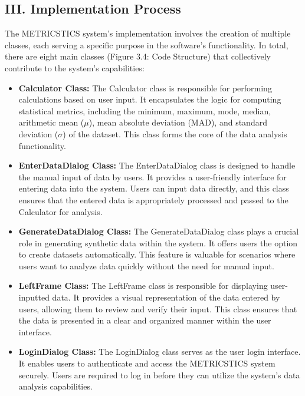 \documentclass[english,12pt,a4paper]{report}
\begin{document}
		\subsection*{III. Implementation Process}
		
		The METRICSTICS system's implementation involves the creation of multiple classes, each serving a specific purpose in the software's functionality. In total, there are eight main classes (Figure 3.4: Code Structure) that collectively contribute to the system's capabilities:
		\begin{itemize}[leftmargin=*]
			
			\item \textbf{Calculator Class:} The Calculator class is responsible for performing calculations based on user input. It encapsulates the logic for computing statistical metrics, including the minimum, maximum, mode, median, arithmetic mean ($\mu$), mean absolute deviation (MAD), and standard deviation ($\sigma$) of the dataset. This class forms the core of the data analysis functionality.
			
			\item \textbf{EnterDataDialog Class:} The EnterDataDialog class is designed to handle the manual input of data by users. It provides a user-friendly interface for entering data into the system. Users can input data directly, and this class ensures that the entered data is appropriately processed and passed to the Calculator for analysis.
			
			\item \textbf{GenerateDataDialog Class:} The GenerateDataDialog class plays a crucial role in generating synthetic data within the system. It offers users the option to create datasets automatically. This feature is valuable for scenarios where users want to analyze data quickly without the need for manual input.
			
			\item \textbf{LeftFrame Class:} The LeftFrame class is responsible for displaying user-inputted data. It provides a visual representation of the data entered by users, allowing them to review and verify their input. This class ensures that the data is presented in a clear and organized manner within the user interface.
			
			\item \textbf{LoginDialog Class:} The LoginDialog class serves as the user login interface. It enables users to authenticate and access the METRICSTICS system securely. Users are required to log in before they can utilize the system's data analysis capabilities.
			

\end{itemize}
\end{document}
